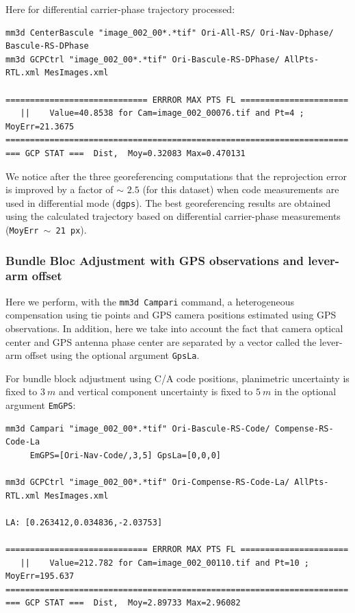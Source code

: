 Here for differential carrier-phase trajectory processed:

\begin{verbatim}
mm3d CenterBascule "image_002_00*.*tif" Ori-All-RS/ Ori-Nav-Dphase/ Bascule-RS-DPhase
mm3d GCPCtrl "image_002_00*.*tif" Ori-Bascule-RS-DPhase/ AllPts-RTL.xml MesImages.xml

============================= ERRROR MAX PTS FL ======================
   ||    Value=40.8538 for Cam=image_002_00076.tif and Pt=4 ; MoyErr=21.3675
======================================================================
=== GCP STAT ===  Dist,  Moy=0.32083 Max=0.470131
\end{verbatim}


We notice after the three georeferencing computations that the reprojection error is improved by a factor of $\sim$ $2.5$ (for this dataset) when code measurements are used in differential mode ({\tt dgps}).
The best georeferencing results are obtained using the calculated trajectory based on differential carrier-phase measurements ({\tt MoyErr $\sim$ 21 px}).

\subsubsection{Bundle Bloc Adjustment with GPS observations and lever-arm offset}
Here we perform, with the {\tt mm3d Campari} command, a heterogeneous compensation using tie points and GPS camera positions estimated using GPS observations. In addition, here we take into account the fact that camera optical center and GPS antenna phase center are separated by a vector called the lever-arm offset using the optional argument {\tt GpsLa}.\newline

For bundle block adjustment using C/A code positions, planimetric uncertainty is fixed to $3\ m$ and vertical component uncertainty is fixed to $5\ m$ in the optional argument {\tt EmGPS}:

\begin{verbatim}
mm3d Campari "image_002_00*.*tif" Ori-Bascule-RS-Code/ Compense-RS-Code-La
     EmGPS=[Ori-Nav-Code/,3,5] GpsLa=[0,0,0]
     
mm3d GCPCtrl "image_002_00*.*tif" Ori-Compense-RS-Code-La/ AllPts-RTL.xml MesImages.xml

LA: [0.263412,0.034836,-2.03753]

============================= ERRROR MAX PTS FL ======================
   ||    Value=212.782 for Cam=image_002_00110.tif and Pt=10 ; MoyErr=195.637
======================================================================
=== GCP STAT ===  Dist,  Moy=2.89733 Max=2.96082
\end{verbatim}


